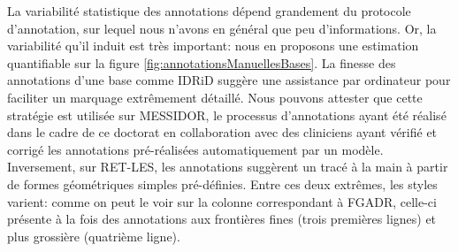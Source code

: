 La variabilité statistique des annotations dépend grandement du protocole d'annotation, sur lequel nous n'avons en général que peu d'informations. Or, la variabilité qu'il induit est très important: nous en proposons une estimation quantifiable sur la figure \ref{fig:annotationsManuellesBases}.
La finesse des annotations d'une base comme \ac{IDRiD} suggère une assistance par ordinateur pour faciliter un marquage extrêmement détaillé. Nous pouvons attester que cette stratégie est utilisée sur MESSIDOR, le processus d'annotations ayant été réalisé dans le cadre de ce doctorat en collaboration avec des cliniciens ayant vérifié et corrigé les annotations pré-réalisées automatiquement par un modèle.
Inversement, sur RET-LES, les annotations suggèrent un tracé à la main à partir de formes géométriques simples pré-définies. Entre ces deux extrêmes, les styles varient: comme on peut le voir sur la colonne correspondant à \ac{FGADR}, celle-ci présente à la fois des annotations aux frontières fines (trois premières lignes) et plus grossière (quatrième ligne).

